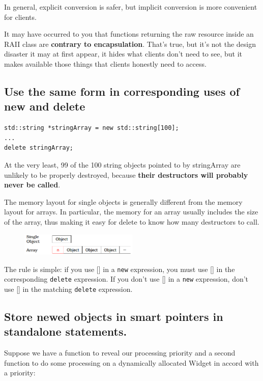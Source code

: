 In general, explicit conversion is safer, but implicit conversion is
more convenient for clients.

It may have occurred to you that functions returning the raw resource
inside an RAII class are \textbf{contrary to encapsulation}.  That's
true, but it's not the design disaster it may at first appear, it
hides what clients don't need to see, but it makes available those
things that clients honestly need to access.

\subsection{Use the same form in corresponding uses of new and delete}
\label{sec:Item-16}

\begin{verbatim}
std::string *stringArray = new std::string[100];
...
delete stringArray;
\end{verbatim}

At the very least, 99 of the 100 string objects pointed to by stringArray
are unlikely to be properly destroyed, because \textbf{their
  destructors will probably never be called}.

The memory layout for single objects is generally different
from the memory layout for arrays. In particular, the memory for an
array usually includes the size of the array, thus making it easy for
delete to know how many destructors to call.

\begin{figure}[H]
  \centering
  \includegraphics[width = 0.5\textwidth]{png/ArrayMemLayout.png}
\end{figure}

The rule is simple: if you use [] in a \texttt{new} expression, you
must use [] in the corresponding \texttt{delete} expression. If you
don't use [] in a \texttt{new} expression, don't use [] in the
matching \texttt{delete} expression.

\subsection{Store newed objects in smart pointers in standalone statements.}
\label{sec:Item-17}

Suppose we have a function to reveal our processing priority and a
second function to do some processing on a dynamically allocated
Widget in accord with a priority:


